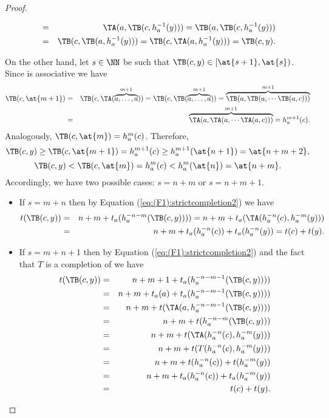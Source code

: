 \begin{proof}
\begin{itemize}
\begin{eqnarray*}
			&=& \TA(a,\TB(c,h_a^{-1}(y)))=\TB(a,\TB(c,h_a^{-1}(y)))\\
			&=& \TB(c,\TB(a,h_a^{-1}(y))) = \TB(c,\TA(a,h_a^{-1}(y)))=\TB(c,y).
		\end{eqnarray*}
	\end{itemize}
	On the other hand, let $s \in \NN$ be such that $\TB(c,y) \in [\at{s+1},\at{s})$. Since \TB is associative we have
	\begin{eqnarray*}
		\TB(c,\at{m+1})&=&\TB(c,\TA(\overbrace{a,\dots,a}^{m+1})) = \TB(c,\TB(\overbrace{a,\dots,a}^{m+1}))= \overbrace{\TB(a,\TB(a,\cdots\TB(a,c)))}^{m+1} \\
		&=& \overbrace{\TA(a,\TA(a,\cdots\TA(a,c)))}^{m+1}=h_a^{m+1}(c).
	\end{eqnarray*}
	Analogously, $\TB(c,\at{m}) = h_a^{m}(c)$. Therefore,
	$$
	\TB(c,y)\geq \TB(c,\at{m+1}) =h_a^{m+1}(c) \geq h_a^{m+1}(\at{n+1})=\at{n+m+2},$$
	$$\TB(c,y) < \TB(c,\at{m}) = h_a^{m}(c) < h_a^{m}(\at{n}) = \at{n+m}.$$
	Accordingly, we have two possible cases: $s=n+m$ or $s=n+m+1$.
	\begin{itemize}
		\item If $s=m+n$ then by Equation (\ref{eq:(F1):strictcompletion2}) we have
		\begin{eqnarray*}
			t(\TB(c,y)) &=& n + m + t_a(h_a^{-n-m}(\TB(c,y)))) = n + m + t_a(\TA(h_a^{-n}(c),h_a^{-m}(y))) \\
			&=& n + m + t_a(h_a^{-n}(c)) + t_a(h_a^{-n}(y))=t(c)+t(y).
		\end{eqnarray*}
		\item If $s=m+n+1$ then by Equation (\ref{eq:(F1):strictcompletion2}) and the fact that $T$ is a completion of \TA we have
		\begin{eqnarray*}
			t(\TB(c,y)) &=& n + m + 1 + t_a(h_a^{-n-m-1}(\TB(c,y)))) \\
			&=& n + m + t_a(a) + t_a(h_a^{-n-m-1}(\TB(c,y)))) \\
			&=& n + m + t(\TA(a,h_a^{-n-m-1}(\TB(c,y))))  \\
			&=& n + m + t(h_a^{-n-m}(\TB(c,y)))\\
			&=& n + m + t(\TA(h_a^{-n}(c),h_a^{-m}(y))) \\
			&=&  n + m + t(T(h_a^{-n}(c),h_a^{-m}(y)))\\
			&=& n + m + t(h_a^{-n}(c)) + t(h_a^{-m}(y)) \\
			&=& n + m + t_a(h_a^{-n}(c)) + t_a(h_a^{-m}(y)) \\
			&=& t(c)+t(y).
		\end{eqnarray*}
	\end{itemize}
\end{proof}

